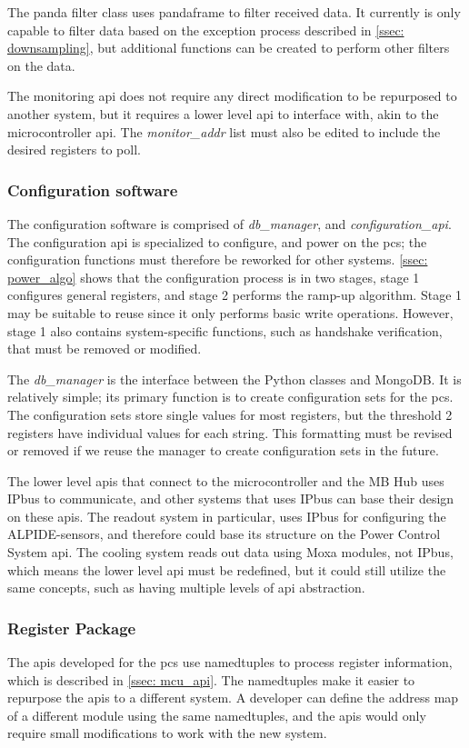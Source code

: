 \documentclass[main.tex]{subfiles}
\begin{document}
The panda filter class uses pandaframe to filter received data. It currently is only capable to filter data based on the exception process described in \autoref{ssec: downsampling}, but additional functions can be created to perform other filters on the data.

The monitoring \gls{api} does not require any direct modification to be repurposed to another system, but it requires a lower level \gls{api} to interface with, akin to the microcontroller \gls{api}. The \textit{monitor\_addr} list must also be edited to include the desired registers to poll.

\subsubsection{Configuration software}

The configuration software is comprised of \textit{db\_manager}, and \textit{configuration\_api}. The configuration \gls{api} is specialized to configure, and power on the \gls{pcs}; the configuration functions must therefore be reworked for other systems. \autoref{ssec: power_algo} shows that the configuration process is in two stages, stage 1 configures general registers, and stage 2 performs the ramp-up algorithm. Stage 1 may be suitable to reuse since it only performs basic write operations. However, stage 1 also contains system-specific functions, such as handshake verification, that must be removed or modified.

The \textit{db\_manager} is the interface between the Python classes and MongoDB. It is relatively simple; its primary function is to create configuration sets for the \gls{pcs}. The configuration sets store single values for most registers, but the threshold 2 registers have individual values for each string. This formatting must be revised or removed if we reuse the manager to create configuration sets in the future. 

The lower level \gls{api}s that connect to the microcontroller and the MB Hub uses IPbus to communicate, and other systems that uses IPbus can base their design on these \gls{api}s. The readout system in particular, uses IPbus for configuring the ALPIDE-sensors, and therefore could base its structure on the Power Control System \gls{api}. The cooling system reads out data using Moxa modules, not IPbus, which means the lower level \gls{api} must be redefined, but it could still utilize the same concepts, such as having multiple levels of \gls{api} abstraction.
 
 \subsubsection{Register Package}
 
The \gls{api}s developed for the \gls{pcs} use namedtuples to process register information, which is described in \autoref{ssec: mcu_api}. The namedtuples make it easier to repurpose the \gls{api}s to a different system. A developer can define the address map of a different module using the same namedtuples, and the \gls{api}s would only require small modifications to work with the new system.
 
\end{document}
